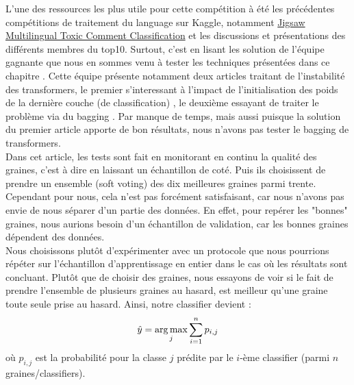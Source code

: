 L'une des ressources les plus utile pour cette compétition à été les précédentes compétitions de traitement du language sur Kaggle, notamment \href{https://www.kaggle.com/c/jigsaw-multilingual-toxic-comment-classification/overview}{Jigsaw Multilingual Toxic Comment Classification} et les discussions et présentations des différents membres du top10. Surtout, c'est en lisant les solution de l'équipe gagnante que nous en sommes venu à tester les techniques présentées dans ce chapitre . Cette équipe présente notamment deux articles traitant de l'instabilité des transformers, le premier s'interessant à l'impact de l'initialisation des poids de la dernière couche (de classification) , le deuxième essayant de traiter le problème via du bagging . Par manque de temps, mais aussi puisque la solution du premier article apporte de bon résultats, nous n'avons pas tester le bagging de transformers. \\
Dans cet article, les tests sont fait en monitorant en continu la qualité des graines, c'est à dire en laissant un échantillon de coté. Puis ils choisissent de prendre un ensemble (soft voting) des dix meilleures graines parmi trente. Cependant pour nous, cela n'est pas forcément satisfaisant, car nous n'avons pas envie de nous séparer d'un partie des données. En effet, pour repérer les "bonnes" graines, nous aurions besoin d'un échantillon de validation, car les bonnes graines dépendent des données. \\
Nous choisissons plutôt d'expérimenter avec un protocole que nous pourrions répéter sur l'échantillon d'apprentissage en entier dans le cas où les résultats sont concluant. Plutôt que de choisir des graines, nous essayons de voir si le fait de prendre l'ensemble de plusieurs graines au hasard, est meilleur  qu'une graine toute seule prise au hasard. Ainsi, notre classifier devient : $$ \hat y = \operatorname*{arg\,max}_j \sum_{i=1}^n p_{i,j} $$ où $p_{i,j}$ est la probabilité pour la classe $j$ prédite par le $i$-ème classifier (parmi $n$ graines/classifiers). \\

